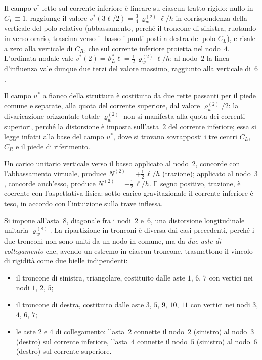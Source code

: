 \begin{esempio}
\begin{svolgimento}
		Il campo $v^*$ letto sul corrente inferiore è lineare su ciascun
		tratto rigido: nullo in $C_L\equiv 1$, raggiunge il valore
		$v^*(3\ell/2)=\tfrac{3}{4}\,\varrho_w^{(2)}\ell/h$ in corrispondenza
		della verticale del polo relativo (abbassamento, perché il troncone
		di sinistra, ruotando in verso orario, trascina verso il basso i
		punti posti a destra del polo $C_L$), e risale a zero alla
		verticale di $C_R$, che sul corrente inferiore proietta nel
		nodo~$4$. L'ordinata nodale vale
		$v^*(2)=\vartheta_L^*\ell=\tfrac{1}{2}\,\varrho_w^{(2)}\ell/h$: al
		nodo~$2$ la linea d'influenza vale dunque due terzi del valore
		massimo, raggiunto alla verticale di~$6$.
		
		Il campo $u^*$ a fianco della struttura è costituito da due rette
		passanti per il piede comune e separate, alla quota del corrente
		superiore, dal valore $\varrho_w^{(2)}/2$: la divaricazione
		orizzontale totale $\varrho_w^{(2)}$ non si manifesta alla quota
		dei correnti superiori, perché la distorsione è imposta sull'asta~$2$
		del corrente inferiore; essa si legge infatti alla base del campo
		$u^*$, dove si trovano sovrapposti i tre centri $C_L$, $C_R$ e il
		piede di riferimento.
		
		Un carico unitario verticale verso il basso applicato al nodo~$2$,
		concorde con l'abbassamento virtuale, produce
		$N^{(2)}=+\tfrac{1}{2}\,\ell/h$ (trazione); applicato al nodo~$3$,
		concorde anch'esso, produce $N^{(2)}=+\tfrac{1}{2}\,\ell/h$. Il
		segno positivo, trazione, è coerente con l'aspettativa fisica:
		sotto carico gravitazionale il corrente inferiore è teso, in
		accordo con l'intuizione sulla trave inflessa.
		
		
		Si impone all'asta~$8$, diagonale fra i nodi~$2$ e~$6$, una
		distorsione longitudinale unitaria $\varrho_w^{(8)}$. La
		ripartizione in tronconi è diversa dai casi precedenti, perché i
		due tronconi non sono uniti da un nodo in comune, ma da \emph{due
			aste di collegamento} che, avendo un estremo in ciascun troncone,
		trasmettono il vincolo di rigidità come due bielle indipendenti:
		\begin{itemize}[noitemsep,topsep=2pt]
			\item il troncone di sinistra, triangolare, costituito dalle
			aste $1$, $6$, $7$ con vertici nei nodi $1$, $2$, $5$;
			\item il troncone di destra, costituito dalle aste $3$, $5$,
			$9$, $10$, $11$ con vertici nei nodi $3$, $4$, $6$, $7$;
			\item le aste $2$ e $4$ di collegamento: l'asta~$2$ connette il
			nodo~$2$ (sinistro) al nodo~$3$ (destro) sul corrente inferiore,
			l'asta~$4$ connette il nodo~$5$ (sinistro) al nodo~$6$ (destro)
			sul corrente superiore.
		\end{itemize}
		

\end{svolgimento}
\end{esempio}
